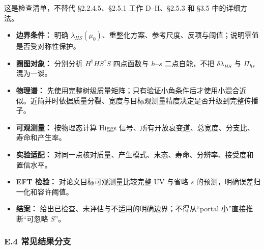 \documentclass[
  chinese,
  UTF8]{ctexart}
\providecommand{\tightlist}{%
  \setlength{\itemsep}{0pt}\setlength{\parskip}{0pt}}
\begin{document}
这是检查清单，不替代 §2.2.4.5、§2.5.1 工作 D--H、§2.5.3 和 §3.5
中的详细方法。

\begin{itemize}
\tightlist
\item[$\square$]
  \textbf{边界条件：} 明确
  \(\lambda_{HS}(\mu_0)\)、重整化方案、参考尺度、反项与阈值；说明零值是否受对称性保护。
\item[$\square$]
  \textbf{圈图对象：} 分别分析 \(H^\dagger H S^\dagger S\) 四点函数与
  \(h\)--\(s\) 二点自能，不把 \(\delta\lambda_{HS}\) 与 \(\Pi_{hs}\)
  混为一谈。
\item[$\square$]
  \textbf{物理谱：}
  先使用完整树级质量矩阵；只有验证小角条件后才使用小混合近似。近简并时依据质量分裂、宽度与目标观测量精度决定是否升级到完整传播子。
\item[$\square$]
  \textbf{可观测量：} 按物理态计算 Higgs
  信号、所有开放衰变道、总宽度、分支比、寿命和产生率。
\item[$\square$]
  \textbf{实验适配：}
  对同一点核对质量、产生模式、末态、寿命、分辨率、接受度和置信水平。
\item[$\square$]
  \textbf{EFT 检验：} 对论文目标可观测量比较完整 UV 与省略 \(s\)
  的预测，明确误差归一化和容许阈值。
\item[$\square$]
  \textbf{结案：} 给出已检查、未评估与不适用的明确边界；不得从``portal
  小''直接推断``可忽略 \(S\)''。
\end{itemize}

\subsubsection{E.4
常见结果分支}\label{e.4-ux5e38ux89c1ux7ed3ux679cux5206ux652f}
\end{document}
